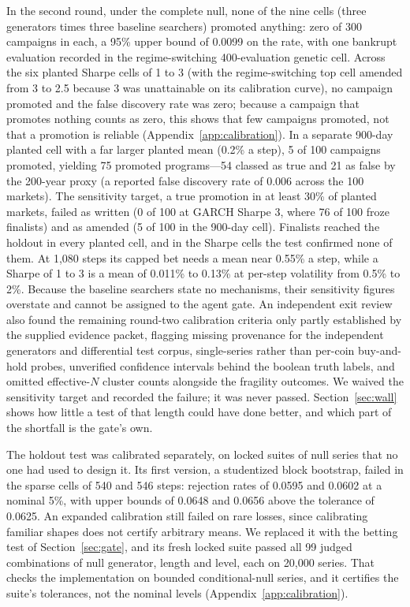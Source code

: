 \documentclass[11pt]{article}
\begin{document}
In the second round, under the complete null, none of the nine cells (three generators times three baseline searchers) promoted anything: zero of 300 campaigns in each, a 95\% upper bound of 0.0099 on the rate, with one bankrupt evaluation recorded in the regime-switching 400-evaluation genetic cell. Across the six planted Sharpe cells of 1 to 3 (with the regime-switching top cell amended from 3 to 2.5 because 3 was unattainable on its calibration curve), no campaign promoted and the false discovery rate was zero; because a campaign that promotes nothing counts as zero, this shows that few campaigns promoted, not that a promotion is reliable (Appendix~\ref{app:calibration}). In a separate 900-day planted cell with a far larger planted mean (0.2\% a step), 5 of 100 campaigns promoted, yielding 75 promoted programs---54 classed as true and 21 as false by the 200-year proxy (a reported false discovery rate of 0.006 across the 100 markets). The sensitivity target, a true promotion in at least 30\% of planted markets, failed as written (0 of 100 at GARCH Sharpe 3, where 76 of 100 froze finalists) and as amended (5 of 100 in the 900-day cell). Finalists reached the holdout in every planted cell, and in the Sharpe cells the test confirmed none of them. At 1{,}080 steps its capped bet needs a mean near 0.55\% a step, while a Sharpe of 1 to 3 is a mean of 0.011\% to 0.13\% at per-step volatility from 0.5\% to 2\%. Because the baseline searchers state no mechanisms, their sensitivity figures overstate and cannot be assigned to the agent gate. An independent exit review also found the remaining round-two calibration criteria only partly established by the supplied evidence packet, flagging missing provenance for the independent generators and differential test corpus, single-series rather than per-coin buy-and-hold probes, unverified confidence intervals behind the boolean truth labels, and omitted effective-$N$ cluster counts alongside the fragility outcomes. We waived the sensitivity target and recorded the failure; it was never passed. Section~\ref{sec:wall} shows how little a test of that length could have done better, and which part of the shortfall is the gate's own.

The holdout test was calibrated separately, on locked suites of null series that no one had used to design it. Its first version, a studentized block bootstrap, failed in the sparse cells of 540 and 546 steps: rejection rates of 0.0595 and 0.0602 at a nominal 5\%, with upper bounds of 0.0648 and 0.0656 above the tolerance of 0.0625. An expanded calibration still failed on rare losses, since calibrating familiar shapes does not certify arbitrary means. We replaced it with the betting test of Section~\ref{sec:gate}, and its fresh locked suite passed all 99 judged combinations of null generator, length and level, each on 20{,}000 series. That checks the implementation on bounded conditional-null series, and it certifies the suite's tolerances, not the nominal levels (Appendix~\ref{app:calibration}).
\end{document}
